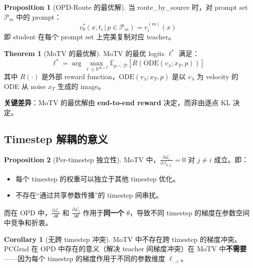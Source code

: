 \documentclass[11pt,a4paper]{article}
\newcommand{\loss}{\mathcal{L}}
\newcommand{\E}{\mathbb{E}}
\newcommand{\R}{\mathbb{R}}
\newcommand{\vtheta}{v_\theta}
\theoremstyle{definition}
\newtheorem{proposition}{Proposition}
\newtheorem{corollary}{Corollary}
\newtheorem{theorem}{Theorem}
\begin{document}
\begin{proposition}[OPD-Route 的最优解]
\label{prop:opd_route_opt}
当 route\_by\_source 时，对 prompt set $\mathcal{P}_m$ 中的 prompt：
\begin{equation}
\vtheta^*(x, t_i \,|\, p \in \mathcal{P}_m) = v^{(m)}_i(x)
\end{equation}
即 student 在每个 prompt set 上完美复制对应 teacher。
\end{proposition}

\begin{theorem}[MoTV 的最优解]
\label{thm:motv_opt}
MoTV 的最优 logits $\ell^*$ 满足：
\begin{equation}
\ell^* = \arg\max_{\ell \in \R^{K \times T}} \E_{p \sim \mathcal{D}}\left[R\!\left(\mathrm{ODE}(v_\lambda; x_T, p)\right)\right]
\label{eq:motv_optimal}
\end{equation}
其中 $R(\cdot)$ 是外部 reward function，$\mathrm{ODE}(v_\lambda; x_T, p)$ 是以 $v_\lambda$ 为 velocity 的 ODE 从 noise $x_T$ 生成的 image。

\textbf{关键差异}：MoTV 的最优解由 \textbf{end-to-end reward} 决定，而非由逐点 KL 决定。
\end{theorem}

\subsection{Timestep 解耦的意义}

\begin{proposition}[Per-timestep 独立性]
\label{prop:timestep_decouple}
MoTV 中，$\frac{\partial \loss_i}{\partial \ell_{k,j}} = 0$ 对 $j \neq i$ 成立。即：
\begin{itemize}
\item 每个 timestep 的权重可以独立于其他 timestep 优化。
\item 不存在``通过共享参数传播''的 timestep 间串扰。
\end{itemize}

而在 OPD 中，$\frac{\partial \loss_i}{\partial \theta}$ 和 $\frac{\partial \loss_j}{\partial \theta}$ 作用于\textbf{同一个} $\theta$，导致不同 timestep 的梯度在参数空间中竞争和折衷。
\end{proposition}

\begin{corollary}[无跨 timestep 冲突]
MoTV 中不存在跨 timestep 的梯度冲突。PCGrad 在 OPD 中存在的意义（解决 teacher 间梯度冲突）在 MoTV 中\textbf{不需要}——因为每个 timestep 的梯度作用于不同的参数维度 $\ell_{:,i}$。
\end{corollary}
\end{document}
